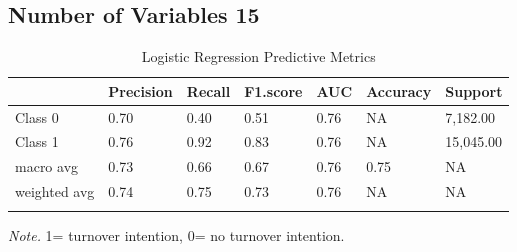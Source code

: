 \documentclass[
  man]{apa7}
\begin{document}
\subsection{Number of Variables 15}\label{number-of-variables-15}

\begin{table}[tbp]

\begin{center}
\begin{threeparttable}

\caption{\label{tab:logitable40}Logistic Regression Predictive Metrics}

\begin{tabular}{lllllll}
\toprule
 & \multicolumn{1}{c}{Precision} & \multicolumn{1}{c}{Recall} & \multicolumn{1}{c}{F1.score} & \multicolumn{1}{c}{AUC} & \multicolumn{1}{c}{Accuracy} & \multicolumn{1}{c}{Support}\\
\midrule
Class 0 & 0.70 & 0.40 & 0.51 & 0.76 & NA & 7,182.00\\
Class 1 & 0.76 & 0.92 & 0.83 & 0.76 & NA & 15,045.00\\
macro avg & 0.73 & 0.66 & 0.67 & 0.76 & 0.75 & NA\\
weighted avg & 0.74 & 0.75 & 0.73 & 0.76 & NA & NA\\
\bottomrule
\addlinespace
\end{tabular}

\begin{tablenotes}[para]
\normalsize{\textit{Note.} 1= turnover intention, 0= no turnover intention.}
\end{tablenotes}

\end{threeparttable}
\end{center}

\end{table}
\end{document}
